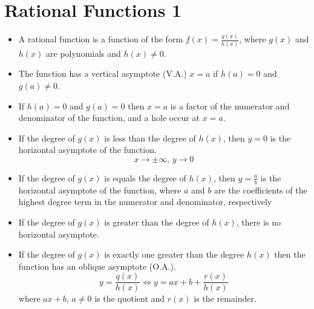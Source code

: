 \section{Rational Functions 1}
\begin{itemize}
    \item A rational function is a function of the form $f(x)=\frac{g(x)}{h(x)}$, where $g(x)$ and $h(x)$ are polynomials and $h(x)\neq 0$.
    \item The function has a vertical asymptote (V.A.) $x=a$ if $h(a)=0$ and $g(a)\neq 0$.
    \item If $h(a)=0$ and $g(a)=0$ then $x=a$ is a factor of the numerator and denominator of the function, and a hole occur at $x=a$. 
    \item If the degree of $g(x)$ is less than the degree of $h(x)$, then $y=0$ is the horizontal asymptote of the function.
        \[
            x\to\pm\infty,\,y\to0
        \]
    \item If the degree of $g(x)$ is equals the degree of $h(x)$, then $y=\frac{a}{b}$ is the horizontal asymptote of the function, where $a$ and $b$ are the coefficients of the highest degree term in the numerator and denominator, respectively
    \item If the degree of $g(x)$ is greater than the degree of $h(x)$, there is no horizontal asymptote.
    \item If the degree of $g(x)$ is exactly one greater than the degree $h(x)$ then the function has an oblique asymptote (O.A.).
    \[
        y=\frac{q(x)}{h(x)}\iff y=ax+b+\frac{r(x)}{h(x)}
    \]
    where $ax+b$, $a\neq0$ is the quotient and $r(x)$ is the remainder.
\end{itemize}

